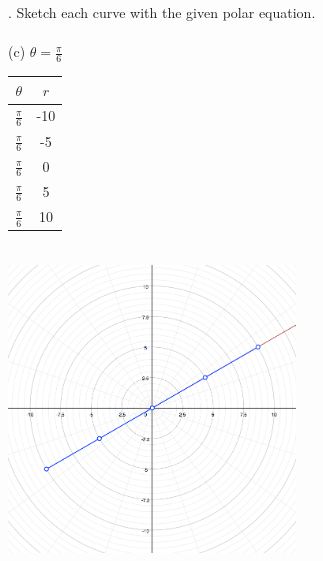 \documentclass[11pt]{exam}
\begin{document}
. Sketch each curve with the given polar equation. \\
\\
\indent (c) $\theta=\frac{\pi}{6}$\\
\newline
\newline
\def\arraystretch{1.5}
\begin{tabular}{ c|c }
  $\theta$ & $r$ \\
  \hline
  $\frac{\pi}{6}$ & -10 \\
  $\frac{\pi}{6}$ & -5  \\
  $\frac{\pi}{6}$ &  0  \\
  $\frac{\pi}{6}$ &  5  \\
  $\frac{\pi}{6}$ &  10 \\
\end{tabular}\\
\includegraphics[width=3in]{g10c.png}
\end{document}
